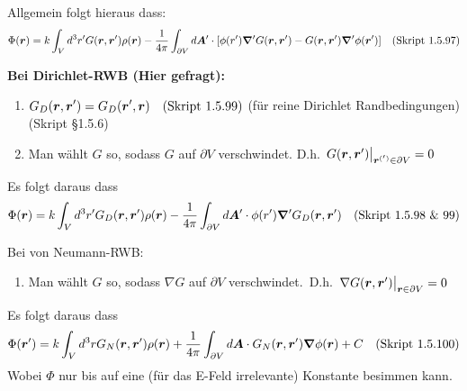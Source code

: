 \begin{enumerate}
        Allgemein folgt hieraus dass:
        \begin{equation*}
          \displaystyle \Phi(\vb* r)=k\int_V d^3r' G(\vb* r, \vb* r')\rho(\vb* r)
         -\frac{1}{4\pi}\int_{\partial V}d\vb* A'
         \cdot\qty[
         \phi(r')\grad' G(\vb* r, \vb* r')
         -G(\vb* r, \vb* r')\grad'\phi(\vb*r') 
         ] \quad\text{(Skript 1.5.97)}
        \end{equation*}

        \textbf{Bei Dirichlet-RWB (Hier gefragt):}
        \begin{center}
        \begin{enumerate}
          \item $\displaystyle G_D(\vb* r, \vb* r')= G_D(\vb* r', \vb* r)
            \quad\text{(Skript 1.5.99)}$ 
            (für reine Dirichlet Randbedingungen) (Skript §1.5.6)
          \item Man wählt $G$ so, sodass $G$ auf $\partial V$ 
            verschwindet. D.h. 
            $\eval{G(\vb*r,\vb*r')}_{\vb*r^{(')}\in\partial V}=0$
        \end{enumerate}
        \end{center}
        Es folgt daraus dass
        \begin{equation*}
          \displaystyle \Phi(\vb* r)=k\int_V d^3r' G_D(\vb* r, \vb* r')\rho(\vb* r)
         -\frac{1}{4\pi}\int_{\partial V}d\vb* A'\cdot\phi(r')
         \grad' G_D(\vb* r, \vb* r') \quad\text{(Skript 1.5.98 \& 99)}
        \end{equation*}        

        Bei von Neumann-RWB:
        \begin{enumerate}
          \item Man wählt $G$ so, sodass $\nabla G$ auf $\partial V$ 
          verschwindet.\ D.h. $\eval{\nabla G(\vb*r,\vb*r')}_{\vb*r\in\partial V}=0$
        \end{enumerate}
        Es folgt daraus dass 
        \begin{equation*}
          \displaystyle \Phi(\vb* r')=
            k\int_V d^3r G_N(\vb* r,\vb* r')\rho(\vb* r)
            +\frac{1}{4\pi} \int_{\partial V} d\vb* A \cdot 
            G_N(\vb* r,\vb* r')\grad\phi(\vb* r) + C \quad\text{(Skript 1.5.100)}
        \end{equation*}
        Wobei $\Phi$ nur bis auf eine (für das E-Feld irrelevante) 
        Konstante besimmen kann.

\end{enumerate}
